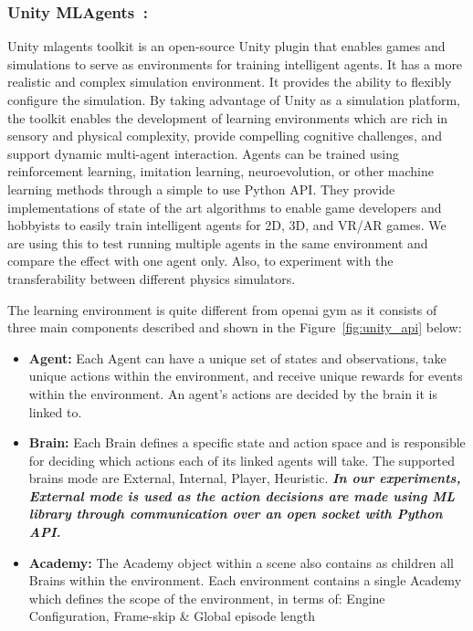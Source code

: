 \subsubsection{Unity MLAgents~\parencite{juliani2018unity}: }\label{unity_mlagents} Unity mlagents toolkit is an open-source Unity plugin that enables games and simulations to serve as environments for training intelligent agents. It has a more realistic and complex simulation environment. It provides the ability to flexibly configure
the simulation. By taking advantage of Unity as a simulation platform, the toolkit enables the development of learning environments which are rich in sensory and physical complexity, provide compelling cognitive challenges, and support dynamic multi-agent interaction. Agents can be trained using reinforcement learning, imitation learning, neuroevolution, or other machine learning methods through a simple to use Python API. They provide implementations of state of the art algorithms to enable game developers and hobbyists to easily train intelligent agents for 2D, 3D, and VR/AR games. We are using this to test running multiple agents in the same environment and compare the effect with one agent only. Also, to experiment with the transferability between different physics simulators.

The learning environment is quite different from openai gym as it consists of three main components described and shown in the Figure~\ref{fig:unity_api} below:

\begin{itemize}
	\item \textbf{Agent:} Each Agent can have a unique set of states and observations, take unique actions within the environment, and receive unique rewards for events within the environment. An agent’s actions are decided by the brain it is linked to.
	\item \textbf{Brain:} Each Brain defines a specific state and action space and is responsible for deciding which actions each of its linked agents will take. The supported brains mode are External, Internal, Player, Heuristic. \textit{\textbf{In our experiments, External mode is used as the action decisions are made using ML library through communication over an open socket with Python API.}}
	\item \textbf{Academy:} The Academy object within a scene also contains as children all Brains within the environment. Each environment contains a single Academy which defines the scope of the environment, in terms of: Engine Configuration, Frame-skip \& Global episode length
\end{itemize}

